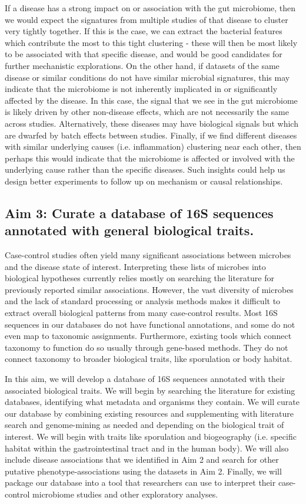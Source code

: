 \documentclass[12pt]{article}
\begin{document}
If a disease has a strong impact on or association with the gut 
microbiome, then we would expect the signatures from multiple studies of that disease
to cluster very tightly together. If this is the case, we can extract 
the bacterial features which contribute the most to this tight 
clustering - these will then be most likely to be associated with that 
specific disease, and would be good candidates for further mechanistic 
explorations. On the other hand, if datasets of the same disease or 
similar conditions do not have similar microbial signatures, this may 
indicate that the microbiome is not inherently implicated in or significantly affected 
by the disease. In this case, the signal that we see in the gut 
microbiome is likely driven by other non-disease effects, which are 
not necessarily the same across studies. Alternatively, these diseases
may have biological signals but which are dwarfed by batch effects
between studies. Finally, if we find different 
diseases with similar underlying causes (i.e. inflammation) clustering 
near each other, then perhaps this would indicate that the microbiome 
is affected or involved with the underlying cause rather than the 
specific diseases. Such insights could help us design better 
experiments to follow up on mechanism or causal relationships.

\subsection{Aim 3: Curate a database of 16S sequences annotated with general biological traits.}
Case-control studies often yield many significant
associations between microbes and the disease state of interest. Interpreting these lists of
microbes into biological hypotheses currently relies mostly on searching
the literature for previously reported similar associations.
However, the vast diversity of microbes and the lack of standard
processing or analysis methods makes it difficult to extract overall
biological patterns from many case-control results.
Most 16S sequences in our databases do not have functional 
annotations, and some do not even map to taxonomic assignments.
Furthermore, existing tools which connect taxonomy to function do
so usually through gene-based methods. They do not connect taxonomy 
to broader biological traits, like sporulation or body habitat.

In this aim, we will develop a database of 16S sequences annotated with 
their associated biological traits. We will begin
by searching the literature for existing databases, identifying
what metadata and organisms they contain. We will curate
our database by combining existing resources and supplementing
with literature search and genome-mining as needed and depending on
the biological trait of interest. We will begin with traits like
sporulation and biogeography (i.e. specific habitat within the 
gastrointestinal tract and in the human body). We will also
include disease associations that we identified in Aim 2 and search
for other putative phenotype-associations using the datasets in Aim 2.
Finally, we will package our database into a tool that researchers can use
to interpret their case-control microbiome studies and other exploratory
analyses.
\end{document}
